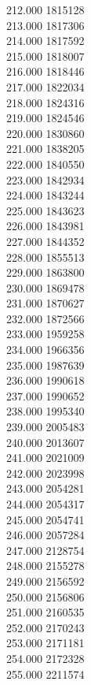 { 212.000	1815128 \\
 213.000	1817306 \\
 214.000	1817592 \\
 215.000	1818007 \\
 216.000	1818446 \\
 217.000	1822034 \\
 218.000	1824316 \\
 219.000	1824546 \\
 220.000	1830860 \\
 221.000	1838205 \\
 222.000	1840550 \\
 223.000	1842934 \\
 224.000	1843244 \\
 225.000	1843623 \\
 226.000	1843981 \\
 227.000	1844352 \\
 228.000	1855513 \\
 229.000	1863800 \\
 230.000	1869478 \\
 231.000	1870627 \\
 232.000	1872566 \\
 233.000	1959258 \\
 234.000	1966356 \\
 235.000	1987639 \\
 236.000	1990618 \\
 237.000	1990652 \\
 238.000	1995340 \\
 239.000	2005483 \\
 240.000	2013607 \\
 241.000	2021009 \\
 242.000	2023998 \\
 243.000	2054281 \\
 244.000	2054317 \\
 245.000	2054741 \\
 246.000	2057284 \\
 247.000	2128754 \\
 248.000	2155278 \\
 249.000	2156592 \\
 250.000	2156806 \\
 251.000	2160535 \\
 252.000	2170243 \\
 253.000	2171181 \\
 254.000	2172328 \\
 255.000	2211574 \\
}
